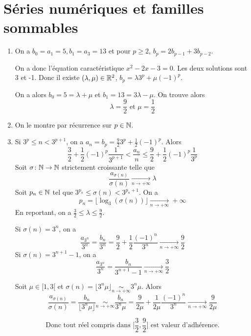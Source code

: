 \section{Séries numériques et familles sommables}

\begin{solution}
	\phantom{}
	\begin{enumerate}
		\item On a $b_{0}=a_{1}=5,b_{1}=a_{3}=13$ et pour $p\geqslant2$, $b_{p}=2b_{p-1}+3b_{p-2}$.
		
		On a donc l'équation caractéristique $x^{2}-2x-3=0$. Les deux solutions sont 3 et -1. Donc il existe $(\lambda,\mu)\in\mathbb{R}^{2}$, $b_{p}=\lambda 3^{p}+\mu(-1)^{p}$.

		On a alors $b_{0}=5=\lambda+\mu$ et $b_{1}=13=3\lambda-\mu$. On trouve alors 
		$$\boxed{\lambda=\frac{9}{2} \text{ et } \mu=\frac{1}{2}}$$

		\item On le montre par récurrence sur $p\in\mathbb{N}$.
		
		\item Si $3^{p}\leqslant n<3^{p+1}$, on a $a_{n}=b_{p}=\frac{9}{2}3^{p}+\frac{1}{2}(-1)^{p}$.
		Alors 
		$$\frac{3}{2}+\frac{1}{2}(-1)^{p}\frac{1}{3^{p+1}}<\frac{a_{n}}{n}\leqslant\frac{9}{2}+\frac{1}{2}(-1)^{p}\frac{1}{3^{p}}$$
		Soit $\sigma\colon\mathbb{N}\to\mathbb{N}$ strictement croissante telle que 
		$$\frac{a_{\sigma(n)}}{\sigma(n)}\xrightarrow[n\to+\infty]{}\lambda$$
		Soit $p_{n}\in\mathbb{N}$ tel que $3^{p_{n}}\leqslant\sigma(n)<3^{p_{n}+1}$. On a 
		$$p_{n}=\bigl\lfloor\log_{3}(\sigma(n))\bigr\rfloor\xrightarrow[n\to+\infty]{}+\infty$$
		En reportant, on a $\frac{3}{2}\leqslant\lambda\leqslant\frac{9}{2}$.

		Si $\sigma(n)=3^{n}$, on a 
		$$\frac{a_{3^{n}}}{3^{n}}=\frac{b_{n}}{3^{n}}=\frac{9}{2}+\frac{1}{2}\frac{(-1)^{n}}{3^{n}}\xrightarrow[n\to+\infty]{}\frac{9}{2}$$
		Si $\sigma(n)=3^{n+1}-1$, on a 
		$$\frac{a_{3^{n}}}{3^{n}}=\frac{b_{n}}{3^{n+1}-1}\xrightarrow[n\to+\infty]{}\frac{3}{2}$$

		Soit $\mu\in[1,3[$ et $\sigma(n)=\lfloor 3^{n}\mu\rfloor\underset{n\to+\infty}{\sim}3^{n}\mu$. Alors 
		$$\frac{a_{\sigma(n)}}{\sigma(n)}=\frac{b_{n}}{\lfloor3^{n}\mu\rfloor}\underset{n\to+\infty}{\sim}\frac{b_{n}}{3^{n}\mu}=\frac{9}{2\mu}+\frac{1}{2\mu}\frac{(-1)^{n}}{3^{n}}\xrightarrow[n\to+\infty]{}\frac{9}{2\mu}$$
		
		$$\boxed{\text{Donc tout réel compris dans } \Biggl[\frac{3}{2},\frac{9}{2}\Biggr] \text{ est valeur d'adhérence.}}$$
	\end{enumerate}
\end{solution}

